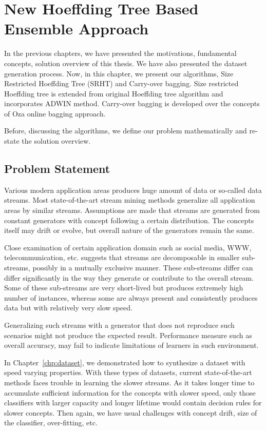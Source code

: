 \chapter{New Hoeffding Tree Based Ensemble Approach}
\label{chp:algo}
In the previous chapters, we have presented the motivations, fundamental concepts, solution overview of this thesis. We have also presented the dataset generation process. Now, in this chapter, we present our algorithms, Size Restricted Hoeffding Tree (SRHT) and Carry-over bagging. Size restricted Hoeffding tree is extended from original Hoeffding tree algorithm and incorporates ADWIN method. Carry-over bagging is developed over the concepts of Oza online bagging approach.

Before, discussing the algorithms, we define our problem mathematically and re-state the solution overview. 

\section{Problem Statement}
Various modern application areas produces huge amount of data or so-called data streams. Most state-of-the-art stream mining methods generalize all application areas by similar streams. Assumptions are made that streams are generated from constant generators with concept following a certain distribution. The concepts itself may drift or evolve, but overall nature of the generators remain the same.

Close examination of certain application domain such as social media, WWW, telecommunication, etc. suggests that streams are decomposable in smaller sub-streams, possibly in a mutually exclusive manner. These sub-streams differ can differ significantly in the way they generate or contribute to the overall stream. Some of these sub-streams are very short-lived but produces extremely high number of instances, whereas some are always present and consistently produces data but with relatively very slow speed.

Generalizing such streams with a generator that does not reproduce such scenarios might not produce the expected result. Performance measure such as overall accuracy, may fail to indicate limitations of learners in such environment.

In Chapter~\ref{chp:dataset}, we demonstrated how to synthesize a dataset with speed varying properties. With these types of datasets, current state-of-the-art methods faces trouble in learning the slower streams. As it takes longer time to accumulate sufficient information for the concepts with slower speed, only those classifiers with larger capacity and longer lifetime would contain decision rules for slower concepts. Then again, we have usual challenges with concept drift, size of the classifier, over-fitting, etc.

